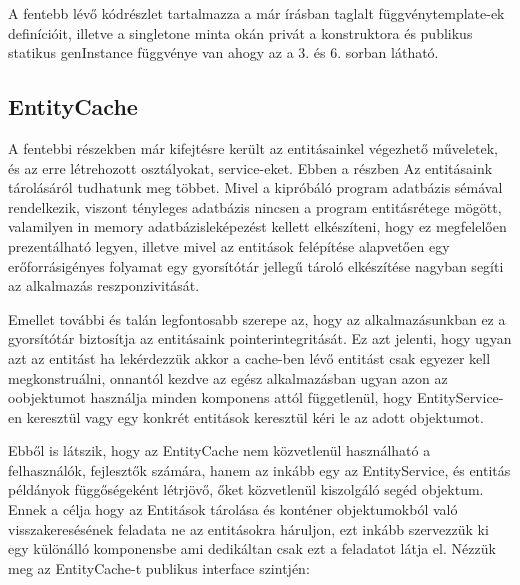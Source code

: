 A fentebb lévő kódrészlet tartalmazza a már írásban taglalt függvénytemplate-ek definícióit, illetve a singletone minta okán privát a konstruktora és publikus statikus genInstance függvénye van ahogy az a 3. és 6. sorban látható.

\subsection{EntityCache}

A fentebbi részekben már kifejtésre került az entitásainkel végezhető műveletek, és az erre létrehozott osztályokat, service-eket. Ebben a részben Az entitásaink tárolásáról tudhatunk meg többet. Mivel a kipróbáló program adatbázis sémával rendelkezik, viszont tényleges adatbázis nincsen a program entitásrétege mögött, valamilyen in memory adatbázisleképezést kellett elkészíteni, hogy ez megfelelően prezentálható legyen, illetve mivel az entitások felépítése alapvetően egy erőforrásigényes folyamat egy gyorsítótár jellegű tároló elkészítése nagyban segíti az alkalmazás reszponzivitását. 

Emellet további és talán legfontosabb szerepe az, hogy az alkalmazásunkban ez a gyorsítótár biztosítja az entitásaink pointerintegritását. Ez azt jelenti, hogy ugyan azt az entitást ha lekérdezzük akkor a cache-ben lévő entitást csak egyezer kell megkonstruálni, onnantól kezdve az egész alkalmazásban ugyan azon az oobjektumot használja minden komponens attól függetlenül, hogy EntityService-en keresztül vagy egy konkrét entitások keresztül kéri le az adott objektumot.

Ebből is látszik, hogy az EntityCache nem közvetlenül használható a felhasználók, fejlesztők számára, hanem az inkább egy az EntityService, és entitás példányok függőségeként létrjövő, őket közvetlenül kiszolgáló segéd objektum. Ennek a célja hogy az Entitások tárolása és konténer objektumokból való visszakeresésének feladata ne az entitásokra háruljon, ezt inkább szervezzük ki egy különálló komponensbe ami dedikáltan csak ezt a feladatot látja el. Nézzük meg az EntityCache-t publikus interface szintjén:

